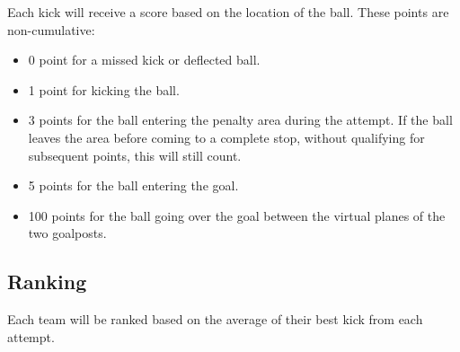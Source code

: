 Each kick will receive a score based on the location of the ball.
These points are non-cumulative: 

\begin{itemize}
	\item 0 point for a missed kick or deflected ball.
	\item 1 point for kicking the ball.
	\item 3 points for the ball entering the penalty area during the attempt. 
	If the ball leaves the area before coming to a complete stop, without qualifying for subsequent points, this will still count. 
	\item 5 points for the ball entering the goal. 
	\item 100 points for the ball going over the goal between the virtual planes of the two goalposts. 
  \end{itemize}

  \subsection{Ranking}

  Each team will be ranked based on the average of their best kick from each attempt.